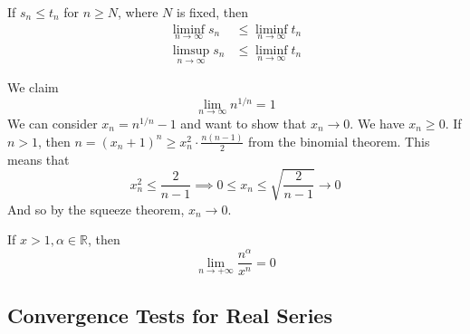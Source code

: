   \begin{theorem}
    \label{thm:ordering-on-subsequential-limits}
    If $s_n \leq t_n$ for $n \geq N$, where $N$ is fixed, then 
    \begin{align*}
      \liminf_{n \rightarrow \infty} s_n & \leq \liminf_{n \rightarrow \infty} t_n \\
      \limsup_{n \rightarrow \infty} s_n & \leq \liminf_{n \rightarrow \infty} t_n 
    \end{align*}
  \end{theorem} 

  \begin{example}
    \label{ex:claim-want-show-binomial-theorem}
    We claim 
    \begin{equation}
      \lim_{n \rightarrow \infty} n^{1/n} = 1 
    \end{equation}
    We can consider $x_n = n^{1/n} - 1$ and want to show that $x_n \rightarrow 0$. We have $x_n \geq 0$. If $n > 1$, then $n = (x_n + 1)^n \geq x_n^2 \cdot \frac{n(n - 1)}{2}$ from the binomial theorem. This means that 
    \begin{equation}
      x_n^2 \leq \frac{2}{n-1} \implies 0 \leq x_n \leq \sqrt{\frac{2}{n-1}} \rightarrow 0
    \end{equation}
    And so by the squeeze theorem, $x_n \rightarrow 0$. 
  \end{example}

  \begin{example}
    \label{ex:limsup-and-liminf}
    If $x > 1, \alpha \in \mathbb{R}$, then 
    \begin{equation}
      \lim_{n \rightarrow +\infty} \frac{n^\alpha}{x^n} = 0
    \end{equation} 
  \end{example}
 
\subsection{Convergence Tests for Real Series}

